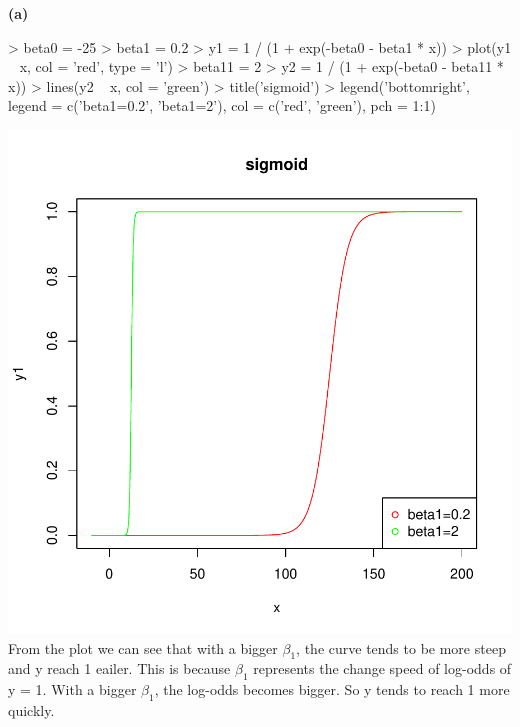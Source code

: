\documentclass[a4paper]{article}
\renewcommand{\part}[1] {\vspace{.10in} {\bf (#1)}}
\begin{document}
\part{a}
\begin{Schunk}
\begin{Sinput}
> beta0 = -25
> beta1 = 0.2
> y1 = 1 / (1 + exp(-beta0 - beta1 * x))
> plot(y1 ~ x, col = 'red', type = 'l')
> beta11 = 2
> y2 = 1 / (1 + exp(-beta0 - beta11 * x))
> lines(y2 ~ x, col = 'green')
> title('sigmoid')
> legend('bottomright', legend = c('beta1=0.2', 'beta1=2'), col = c('red', 'green'), pch = 1:1)
\end{Sinput}
\end{Schunk}
\includegraphics{category_response-2a}
{\color{red}\\
From the plot we can see that with a bigger $\beta_1$, the curve tends to be more steep and y reach 1 eailer. This is because $\beta_1$ represents the change speed of log-odds of y = 1. With a bigger $\beta_1$, the log-odds becomes bigger. So y tends to reach 1 more quickly.
}
\end{document}
